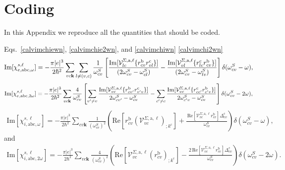 \section{Coding}\label{code}
In this Appendix we reproduce all the quantities  that should be coded.

Eqs.~\eqref{calvimchiewn}, \eqref{calvimchie2wn}, and \eqref{calvimchiwn}
\eqref{calvimchi2wn}
\begin{eqnarray}\label{c-calvimchiewn}
\mathrm{Im}[\chi_{e,\mathrm{a}\mathrm{b}\mathrm{c},\omega}^{s,\ell}] =
-\frac{\pi |e|^3}{2\hbar^2}\sum_{vc\mathbf{k}}\sum_{l\neq(v,c)}\frac{1}{\omega^{S}_{cv}}
\left[
\frac{\mathrm{Im}[\mathcal{V}^{\Sigma,\text{a},\ell}_{lc}\{r^{\mathrm{b}}_{cv}r^{\mathrm{c}}_{vl}\}]}
{(2\omega^S_{cv}-\omega^S_{cl})} 
-\frac{\mathrm{Im}[\mathcal{V}^{\Sigma,\text{a},\ell}_{vl}\{r^{\mathrm{c}}_{lc}r^{\mathrm{b}}_{cv}\}]}
{(2\omega^S_{cv}-\omega^S_{lv})}
\right]\delta(\omega^S_{cv}-\omega),
\end{eqnarray}  
\begin{eqnarray}\label{c-calvimchie2wn}
\mathrm{Im}[\chi_{e,\mathrm{a}\mathrm{b}\mathrm{c},2\omega}^{s,\ell}] =
-\frac{\pi |e|^3}{2\hbar^2}\sum_{vc\mathbf{k}}\frac{4}{\omega^{S}_{cv}}
\left[
\sum_{v'\ne
  v}\frac{\mathrm{Im}[\mathcal{V}^{\Sigma,\text{a},\ell}_{vc}\{r^{\mathrm{b}}_{cv'}r^{\mathrm{c}}_{v'v}\}]}
{2\omega^S_{cv'}-\omega^S_{cv}}
- \sum_{c'\ne
  c}\frac{\mathrm{Im}[\mathcal{V}^{\Sigma,\text{a},\ell}_{vc}\{r^{\mathrm{c}}_{cc'}r^{\mathrm{b}}_{c'v}\}]}
{2\omega^S_{c'v}-\omega^S_{cv}}
\right]\delta(\omega^S_{cv}-2\omega),
\end{eqnarray}
\begin{eqnarray}\label{c-calvimchiwn}
\mathrm{Im}[\chi_{i,\text{a}\text{b}\text{c},\omega}^{s,\ell}]
= -\frac{\pi\vert e\vert^3}{2\hbar^2}\sum_{cv\mathbf{k}}\frac{1}{(\omega^{S}_{cv})^{2}}
\left(
\mathrm{Re}\left[r^{\text{b}}_{cv}\left(\mathcal{V}^{\Sigma,\text{a},\ell}_{vc}\right)_{;k^{\text{c}}}\right]
+\frac{\,\mathrm{Re}\left[\mathcal{V}^{\Sigma,\text{a},\ell}_{vc}r^{\text{b}}_{cv}\right]
\Delta^{\text{c}}_{cv}}{\omega^{S}_{cv}} 
\right)\delta(\omega^{S}_{cv}-\omega),
\end{eqnarray}
and
\begin{eqnarray}\label{c-calvimchi2wn}
\mathrm{Im}[\chi_{i,\text{a}\text{b}\text{c},2\omega}^{s,\ell}] 
=
 -\frac{\pi \vert
   e\vert^{3}}{2\hbar^2}\sum_{vc\mathbf{k}}\frac{4}{(\omega^{S}_{cv})^{2}}
\left(\mathrm{Re}\left[\mathcal{V}^{\Sigma,\text{a},\ell}_{vc}\left(r^{\text{b}}_{cv}\right)_{;k^{\text{c}}}
\right] -
\frac{2\,\mathrm{Re}\left[\mathcal{V}^{\Sigma,\text{a},\ell}_{vc}r^{\text{b}}_{cv}\right]
\Delta^{\text{c}}_{cv}}{\omega^{S}_{cv}}\right)\delta(\omega^{S}_{cv}-2\omega).
\end{eqnarray}

